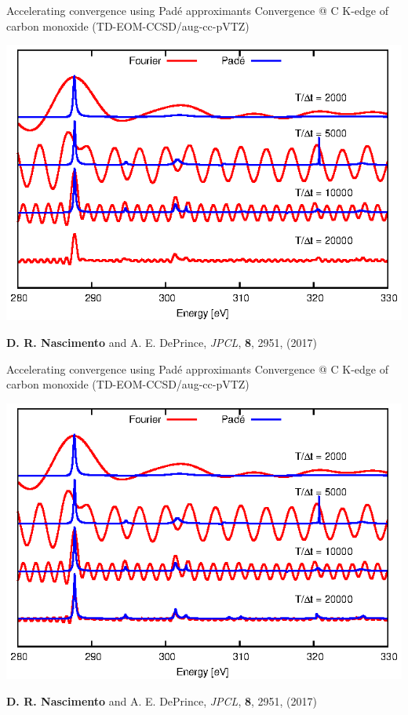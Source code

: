 \documentclass{beamer}
\begin{document}
\begin{frame}{Accelerating convergence using Pad{\'e} approximants}
Convergence @ C K-edge of carbon monoxide (TD-EOM-CCSD/aug-cc-pVTZ)
\begin{center}
 \includegraphics[scale=1.0]{figures/pade_anim_3.eps}
\end{center}
\footnotesize{{\bf D. R. Nascimento} and A. E. DePrince, {\it JPCL}, {\bf 8}, 2951, (2017)} 
\end{frame}

\begin{frame}{Accelerating convergence using Pad{\'e} approximants}
Convergence @ C K-edge of carbon monoxide (TD-EOM-CCSD/aug-cc-pVTZ)
\begin{center}
 \includegraphics[scale=1.0]{figures/pade_anim_4.eps}
\end{center}
\footnotesize{{\bf D. R. Nascimento} and A. E. DePrince, {\it JPCL}, {\bf 8}, 2951, (2017)} 
\end{frame}
\end{document}
